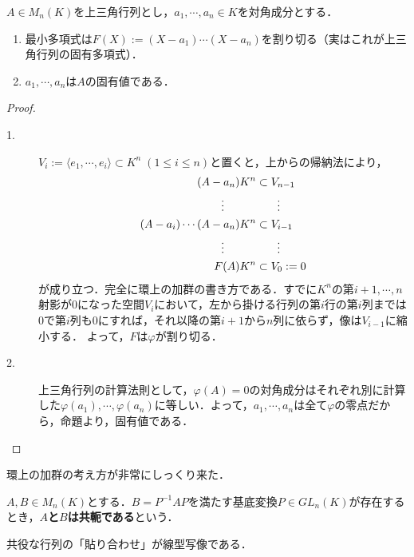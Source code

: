 \documentclass[uplatex, dvipdfmx]{jsreport}
\begin{document}
\begin{proposition}[上三角行列の固有値]\label{prop-eigenvalue-of-triangular-matrices}
    $A\in M_n(K)$を上三角行列とし，$a_1,\cdots,a_n\in K$を対角成分とする．
    \begin{enumerate}
        \item 最小多項式は$F(X):=(X-a_1)\cdots(X-a_n)$を割り切る（実はこれが上三角行列の固有多項式）．
        \item $a_1,\cdots,a_n$は$A$の固有値である．
    \end{enumerate}
\end{proposition}
\begin{proof}\mbox{}
    \begin{description}
        \item[1.] $V_i:=\langle e_1,\cdots,e_i\rangle\subset K^n\;(1\le i\le n)$と置くと，上からの帰納法により，
        \begin{align*}
            (A-a_n)K^n&\subset V_{n-1}\\
            \vdots\hphantom{\;\;\;\;\;K^n}&\hphantom{\subset}\;\;\;\;\vdots\\
            (A-a_i)\cdots(A-a_n)K^n&\subset V_{i-1}\\
            \vdots\hphantom{\;\;\;\;\;K^n}&\hphantom{\subset}\;\;\;\;\vdots\\
            F(A)K^n&\subset V_0:=0
        \end{align*}
        が成り立つ．完全に環上の加群の書き方である．すでに$K^n$の第$i+1,\cdots,n$射影が$0$になった空間$V_i$において，左から掛ける行列の第$i$行の第$i$列までは$0$で第$i$列も$0$にすれば，それ以降の第$i+1$から$n$列に依らず，像は$V_{i-1}$に縮小する．
        よって，$F$は$\varphi$が割り切る．
        \item[2.] 上三角行列の計算法則として，$\varphi(A)=0$の対角成分はそれぞれ別に計算した$\varphi(a_1),\cdots,\varphi(a_n)$に等しい．よって，$a_1,\cdots,a_n$は全て$\varphi$の零点だから，命題より，固有値である．
    \end{description}
\end{proof}
\begin{remark}
    環上の加群の考え方が非常にしっくり来た．
\end{remark}

\begin{definition}[conjugate]\label{def-conjugate}
    $A,B\in M_n(K)$とする．$B=P^{-1}AP$を満たす基底変換$P\in GL_n(K)$が存在するとき，\textbf{$A$と$B$は共軛である}という．
\end{definition}
\begin{remark}
    共役な行列の「貼り合わせ」が線型写像である．
\end{remark}
\end{document}
